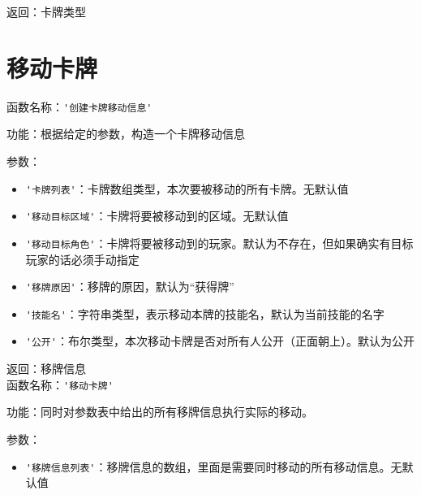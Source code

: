 返回：卡牌类型

\section{移动卡牌}

函数名称：\verb|'创建卡牌移动信息'|

功能：根据给定的参数，构造一个卡牌移动信息

参数：

\begin{itemize}
  \item \verb|'卡牌列表'|：卡牌数组类型，本次要被移动的所有卡牌。无默认值
  \item \verb|'移动目标区域'|：卡牌将要被移动到的区域。无默认值
  \item \verb|'移动目标角色'|：卡牌将要被移动到的玩家。默认为不存在，但如果确实有目标玩家的话必须手动指定
  \item \verb|'移牌原因'|：移牌的原因，默认为“获得牌”
  \item \verb|'技能名'|：字符串类型，表示移动本牌的技能名，默认为当前技能的名字
  \item \verb|'公开'|：布尔类型，本次移动卡牌是否对所有人公开（正面朝上）。默认为公开
\end{itemize}

返回：移牌信息 \\

函数名称：\verb|'移动卡牌'|

功能：同时对参数表中给出的所有移牌信息执行实际的移动。

参数：

\begin{itemize}
  \item \verb|'移牌信息列表'|：移牌信息的数组，里面是需要同时移动的所有移动信息。无默认值
\end{itemize}
